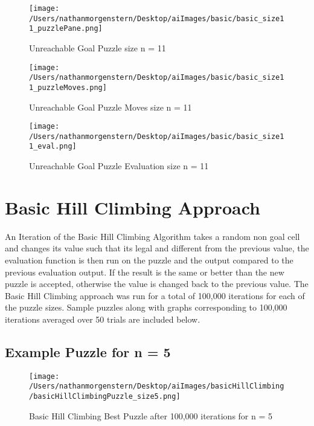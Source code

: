 \documentclass{report}
\begin{document}
	\begin{figure}[H]
	\centering
	\texttt{[image: /Users/nathanmorgenstern/Desktop/aiImages/basic/basic\_size11\_puzzlePane.png]}
	\caption{Unreachable Goal Puzzle size n = 11}
	\label{fig: Basic Evaluation n = 11 unreachable goal puzzle }
	\end{figure}
	
	\begin{figure}[H]
	\centering
	\texttt{[image: /Users/nathanmorgenstern/Desktop/aiImages/basic/basic\_size11\_puzzleMoves.png]}
	\caption{Unreachable Goal Puzzle Moves size n = 11}
	\label{fig: Basic Evaluation n = 11 unreachable goal puzzle moves}
	\end{figure}
	
	\begin{figure}[H]
	\centering
	\texttt{[image: /Users/nathanmorgenstern/Desktop/aiImages/basic/basic\_size11\_eval.png]}
	\caption{Unreachable Goal Puzzle Evaluation size n = 11}
	\label{fig: Basic Evaluation n = 11 unreachable goal puzzle evaluation}
	\end{figure}


\section{Basic Hill Climbing Approach}
An Iteration of the Basic Hill Climbing Algorithm takes a random non goal cell and changes its value such that its legal and different from the previous value, the evaluation function is then run on the puzzle and the output compared to the previous evaluation output. If the result is the same or better than the new puzzle is accepted, otherwise the value is changed back to the previous value. The Basic Hill Climbing approach was run for a total of 100,000 iterations for each of the puzzle sizes. Sample puzzles along with graphs corresponding to 100,000 iterations averaged over 50 trials are included below.

\subsection{Example Puzzle for n = 5}

	\begin{figure}[H]
	\centering
	\texttt{[image: /Users/nathanmorgenstern/Desktop/aiImages/basicHillClimbing/basicHillClimbingPuzzle\_size5.png]}
	\caption{Basic Hill Climbing Best Puzzle after 100,000 iterations for n = 5} 
	\label{fig: Basic Hill Climbing Best Puzzle after 100,000 iterations for n = 5}
	\end{figure}
	
\end{document}
